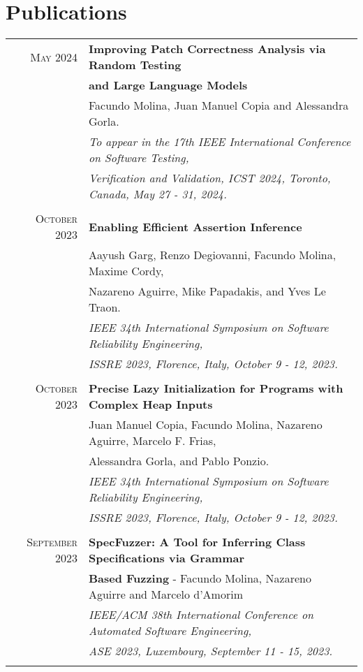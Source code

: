\documentclass[a4paper,10pt]{article} %
\begin{document}
\section{Publications}
\begin{longtable}{rl}

\textsc{May} 2024  & \textbf{Improving Patch Correctness Analysis via Random Testing} \\
        & \textbf{and Large Language Models} \\
        & Facundo Molina, Juan Manuel Copia and Alessandra Gorla. \\
        & \textit{To appear in the 17th IEEE International Conference on Software Testing,} \\
        & \textit{Verification and Validation, ICST 2024, Toronto, Canada, May 27 - 31, 2024.} \\ & \\

\textsc{October} 2023  & \textbf{Enabling Efficient Assertion Inference} \\
        & Aayush Garg, Renzo Degiovanni, Facundo Molina, Maxime Cordy,\\
        & Nazareno Aguirre, Mike Papadakis, and Yves Le Traon. \\
        & \textit{IEEE 34th International Symposium on Software Reliability Engineering,} \\
        & \textit{ISSRE 2023, Florence, Italy, October 9 - 12, 2023.} \\ & \\

\textsc{October} 2023  & \textbf{Precise Lazy Initialization for Programs with Complex Heap Inputs} \\
        & Juan Manuel Copia, Facundo Molina, Nazareno Aguirre, Marcelo F. Frias,\\
        & Alessandra Gorla, and Pablo Ponzio. \\
        & \textit{IEEE 34th International Symposium on Software Reliability Engineering,} \\
        & \textit{ISSRE 2023, Florence, Italy, October 9 - 12, 2023.} \\ & \\

\textsc{September} 2023  & \textbf{SpecFuzzer: A Tool for Inferring Class Specifications via Grammar} \\
        & \textbf{Based Fuzzing} - Facundo Molina, Nazareno Aguirre and Marcelo d'Amorim \\
        & \textit{IEEE/ACM 38th International Conference on Automated Software Engineering,} \\
        & \textit{ASE 2023, Luxembourg, September 11 - 15, 2023.} \\ & \\


\end{longtable}
\end{document}
